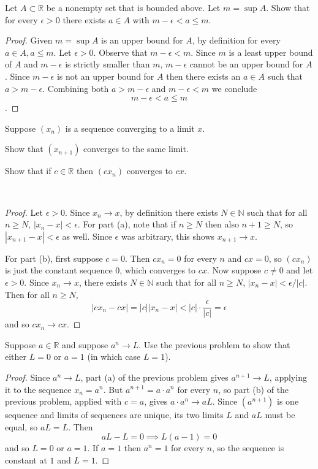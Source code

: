 \documentclass[minion]{homework}
\newcommand{\Reals}{\ensuremath{\mathbb R}}%
\newcommand{\Nats}{\ensuremath{\mathbb N}} %
\begin{document}
\begin{problems}
Let $A\subset \Reals$ be a nonempty set that is bounded above.
Let $m=\sup A$.  Show that for every $\epsilon>0$ there exists $a\in A$
with $m-\epsilon < a \le m$.
\newline
\begin{proof}
  Given $m = \sup A$ is an upper bound for $A$, by definition for every $a \in A, a \leq m$.
  Let $\epsilon > 0$. Observe that $m - \epsilon < m$. Since $m$ is a least upper bound of $A$ and $m - \epsilon$ is strictly smaller than $m$, $m - \epsilon$ cannot be an upper bound for $A$. Since $m-\epsilon$ is not an upper bound for $A$ then there exists an $a \in A$ such that $a > m - \epsilon$. 
  Combining both $a > m - \epsilon$ and $m - \epsilon < m$ we conclude
  $$m-\epsilon < a \leq m$$.
\end{proof}

\problem Suppose $(x_n)$ is a sequence converging to a limit $x$.
\begin{subproblems}
\item Show that $(x_{n+1})$ converges to the same limit.
\item Show that if $c\in\Reals$ then $(cx_{n})$ converges to $c x$.
\end{subproblems}
$ $
\begin{proof}
  Let $\epsilon > 0$. Since $x_n \to x$, by definition there exists $N \in \Nats$ such that for all $n \geq N$, $|x_n - x| < \epsilon$. For part (a), note that if $n \geq N$ then also $n+1 \geq N$, so $|x_{n+1} - x| < \epsilon$ as well. Since $\epsilon$ was arbitrary, this shows $x_{n+1} \to x$.

  For part (b), first suppose $c = 0$. Then $cx_n = 0$ for every $n$ and $cx = 0$, so $(cx_n)$ is just the constant sequence $0$, which converges to $cx$. Now suppose $c \neq 0$ and let $\epsilon > 0$. Since $x_n \to x$, there exists $N \in \Nats$ such that for all $n \geq N$, $|x_n - x| < \epsilon/|c|$. Then for all $n \geq N$,
  $$|cx_n - cx| = |c||x_n - x| < |c| \cdot \frac{\epsilon}{|c|} = \epsilon$$
  and so $cx_n \to cx$.
\end{proof}

\problem Suppose $a\in\Reals$ and suppose $a^n\to L$.
Use the previous problem to show that either $L=0$ or
$a=1$ (in which case $L=1$).
\newline
\begin{proof}
  Since $a^n \to L$, part (a) of the previous problem gives $a^{n+1} \to L$, applying it to the sequence $x_n = a^n$. But $a^{n+1} = a \cdot a^n$ for every $n$, so part (b) of the previous problem, applied with $c = a$, gives $a \cdot a^n \to aL$. Since $(a^{n+1})$ is one sequence and limits of sequences are unique, its two limits $L$ and $aL$ must be equal, so $aL = L$. Then
  $$aL - L = 0 \implies L(a-1) = 0$$
  and so $L = 0$ or $a = 1$. If $a=1$ then $a^n = 1$ for every $n$, so the sequence is constant at $1$ and $L=1$.
\end{proof}


\end{problems}
\end{document}
